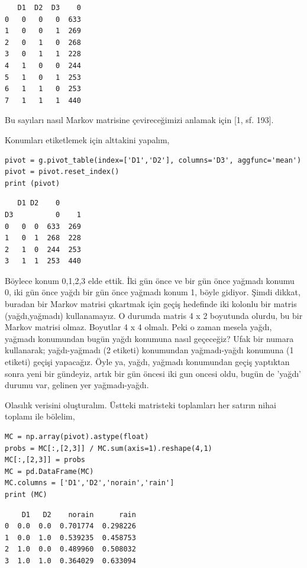 \documentclass[12pt,fleqn]{article}\usepackage{../../common}
\begin{document}
\begin{verbatim}
   D1  D2  D3    0
0   0   0   0  633
1   0   0   1  269
2   0   1   0  268
3   0   1   1  228
4   1   0   0  244
5   1   0   1  253
6   1   1   0  253
7   1   1   1  440
\end{verbatim}

Bu sayıları nasıl Markov matrisine çevireceğimizi anlamak için [1, sf. 193].

Konumları etiketlemek için alttakini yapalım,

\begin{verbatim}
pivot = g.pivot_table(index=['D1','D2'], columns='D3', aggfunc='mean')
pivot = pivot.reset_index()
print (pivot)
\end{verbatim}

\begin{verbatim}
   D1 D2    0     
D3          0    1
0   0  0  633  269
1   0  1  268  228
2   1  0  244  253
3   1  1  253  440
\end{verbatim}

Böylece konum 0,1,2,3 elde ettik. İki gün önce ve bir gün önce yağmadı konumu 0,
iki gün önce yağdı bir gün önce yağmadı konum 1, böyle gidiyor. Şimdi dikkat,
buradan bir Markov matrisi çıkartmak için geçiş hedefinde iki kolonlu bir matris
(yağdı,yağmadı) kullanamayız. O durumda matris 4 x 2 boyutunda olurdu, bu bir
Markov matrisi olmaz. Boyutlar 4 x 4 olmalı. Peki o zaman mesela yağdı, yağmadı
konumundan bugün yağdı konumuna nasıl geçeceğiz? Ufak bir numara kullanarak;
yağdı-yağmadı (2 etiketi) konumundan yağmadı-yağdı konumuna (1 etiketi) geçişi
yapacağız. Öyle ya, yağdı, yağmadı konumundan geçiş yaptıktan sonra yeni bir
gündeyiz, artık bir gün öncesi iki gun oncesi oldu, bugün de 'yağdı' durumu var,
gelinen yer yağmadı-yağdı.

Olasılık verisini oluşturalım. Üstteki matristeki toplamları her satırın nihai
toplamı ile bölelim,

\begin{verbatim}
MC = np.array(pivot).astype(float)
probs = MC[:,[2,3]] / MC.sum(axis=1).reshape(4,1)
MC[:,[2,3]] = probs
MC = pd.DataFrame(MC)
MC.columns = ['D1','D2','norain','rain']
print (MC)
\end{verbatim}

\begin{verbatim}
    D1   D2    norain      rain
0  0.0  0.0  0.701774  0.298226
1  0.0  1.0  0.539235  0.458753
2  1.0  0.0  0.489960  0.508032
3  1.0  1.0  0.364029  0.633094
\end{verbatim}
\end{document}
